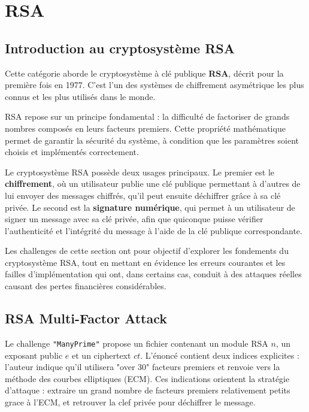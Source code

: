     \section{RSA}
    \subsection{Introduction au cryptosystème RSA}
    Cette catégorie aborde le cryptosystème à clé publique
    \textbf{RSA}, décrit pour la première fois en 1977. C’est l’un des
    systèmes de chiffrement asymétrique les plus connus et les plus
    utilisés dans le monde.

    RSA repose sur un principe fondamental : la difficulté de factoriser de
    grands nombres composés en leurs facteurs premiers. Cette propriété
    mathématique permet de garantir la sécurité du système, à condition que
    les paramètres soient choisis et implémentés correctement.

    Le cryptosystème RSA possède deux usages principaux. Le premier est le
    \textbf{chiffrement}, où un utilisateur publie une clé publique
    permettant à d’autres de lui envoyer des messages chiffrés, qu’il peut
    ensuite déchiffrer grâce à sa clé privée. Le second est la
    \textbf{signature numérique}, qui permet à un utilisateur de signer un
    message avec sa clé privée, afin que quiconque puisse vérifier
    l’authenticité et l’intégrité du message à l’aide de la clé publique
    correspondante.

    Les challenges de cette section ont pour objectif d’explorer les
    fondements du cryptosystème RSA, tout en mettant en évidence les erreurs
    courantes et les failles d’implémentation qui ont, dans certains cas,
    conduit à des attaques réelles causant des pertes financières
    considérables.

    \subsection{RSA Multi-Factor Attack}
    Le challenge \texttt{"ManyPrime"} propose un fichier contenant un
    module RSA $n$, un exposant public $e$ et un ciphertext $ct$. L'énoncé
    contient deux indices explicites : l'auteur indique qu'il utilisera
    "over 30" facteurs premiers et renvoie vers la méthode des courbes
    elliptiques (ECM). Ces indications orientent la stratégie d'attaque :
    extraire un grand nombre de facteurs premiers relativement petits grace à
    l'ECM, et retrouver la clef privée pour déchiffrer le message.

